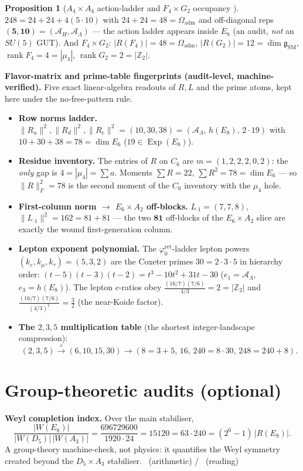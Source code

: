 \documentclass[11pt,a4paper]{article}
\newcommand{\Oadm}{\Omega_{\mathrm{adm}}}
\newcommand{\phiz}{\varphi_0^{\mathrm{ret}}}
\newcommand{\AL}{\mathcal A_\Lambda}
\newcommand{\AH}{\mathcal A_H}
\newcommand{\Z}{\mathbb{Z}}
\theoremstyle{definition}
\newtheorem{proposition}{Proposition}
\begin{document}
\begin{proposition}[$A_4\times A_4$ action-ladder and $F_4\times G_2$ occupancy \mO]
$248=24+24+4(5\cdot10)$ with $24+24=48=\Oadm$ and off-diagonal reps $(\mathbf 5,\mathbf{10})=(\AH,\AL)$
--- the action ladder appears inside $E_8$ (an audit, \emph{not} an $SU(5)$ GUT). And
$F_4\times G_2$: $|R(F_4)|=48=\Oadm$, $|R(G_2)|=12=\dim\mathfrak g_{\mathrm{SM}}$,
$\operatorname{rank}F_4=4=|\mu_4|$, $\operatorname{rank}G_2=2=|\Z_2|$.
\end{proposition}

\par\smallskip\noindent\textbf{Flavor-matrix and prime-table fingerprints (audit-level, machine-verified).}
Five exact linear-algebra readouts of $R,L$ and the prime atoms, kept here under the no-free-pattern rule.
\begin{itemize}\setlength\itemsep{2pt}
\item\textbf{Row norms ladder.} $\|R_u\|^2,\|R_d\|^2,\|R_e\|^2=(10,30,38)=(\AL,\,h(E_8),\,2\cdot19)$ with
$10{+}30{+}38=78=\dim E_6$ ($19\in\operatorname{Exp}(E_8)$).
\item\textbf{Residue inventory.} The entries of $R$ on $C_6$ are $m=(1,2,2,2,0,2)$: the \emph{only} gap is
$4=|\mu_4|=\sum a$. Moments $\sum R=22$, $\sum R^2=78=\dim E_6$ --- so $\|R\|_F^2=78$ is the second moment
of the $C_6$ inventory with the $\mu_4$ hole.
\item\textbf{First-column norm $\to$ $E_6{\times}A_2$ off-blocks.} $L_{\cdot1}=(7,7,8)$, $\|L_{\cdot1}\|^2=162=81+81$
--- the two $\mathbf{81}$ off-blocks of the $E_6{\times}A_2$ slice are exactly the wound first-generation column.
\item\textbf{Lepton exponent polynomial.} The $\phiz$-ladder lepton powers $(k_e,k_\mu,k_\tau)=(5,3,2)$ are
the Coxeter primes $30=2\cdot3\cdot5$ in hierarchy order: $(t-5)(t-3)(t-2)=t^3-10t^2+31t-30$
($e_1=\AL$, $e_3=h(E_8)$). The lepton $c$-ratios obey $\tfrac{(16/7)(7/6)}{4/3}=2=|\Z_2|$ and
$\tfrac{(16/7)(7/6)}{(4/3)^2}=\tfrac32$ (the near-Koide factor).
\item\textbf{The $2,3,5$ multiplication table} (the shortest integer-landscape compression):
\[
  (2,3,5)\xrightarrow{\times}(6,10,15,30)\xrightarrow{}(8{=}3{+}5,\,16,\,240{=}8\cdot30,\,248{=}240{+}8).
\]
\end{itemize}
\par\smallskip

\section{Group-theoretic audits (optional)}
\par\smallskip\noindent\textbf{Weyl completion index.}
Over the main stabiliser,
\[
  \frac{|W(E_8)|}{|W(D_5)|\,|W(A_3)|}=\frac{696729600}{1920\cdot24}=15120=63\cdot240=(2^6-1)\,|R(E_8)| .
\]
A group-theory machine-check, not physics: it quantifies the Weyl symmetry created beyond the
$D_5\times A_3$ stabiliser. \mE\ (arithmetic) / \mO\ (reading)
\par\smallskip
\end{document}
